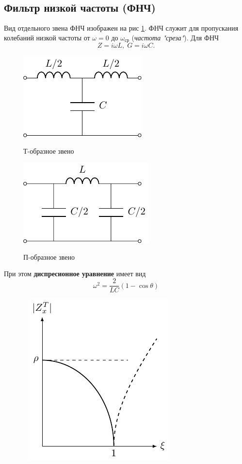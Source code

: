 \subsection{Фильтр низкой частоты (ФНЧ)}
Вид отдельного звена ФНЧ изображен на рис \ref{fig:1.1}. ФНЧ служит для пропускания колебаний низкой частоты от $\omega=0$ до $\omega_{\text{ср}}$ (\textit{частота "среза"}). Для ФНЧ
\begin{equation}
\label{eq:5.1.1}
Z=i\omega L,\;G=i\omega C.
\end{equation}
\begin{figure}[h!]
	\begin{minipage}{0.49\linewidth}
		\centering
		\includegraphics[]{chem/FLF/FLFT.pdf}
		\caption*{Т-образное звено}
	\end{minipage}
\begin{minipage}{0.49\linewidth}
	\centering
	\includegraphics[]{chem/FLF/FLFP.pdf}
	\caption*{П-образное звено}
\end{minipage}
\caption{}
\label{fig:1.1}
\end{figure}
При этом \textbf{диспресионное уравнение} имеет вид 
\begin{equation}
\label{eq:5.1.2}
\omega^2=\frac{2}{LC}(1-\cos\theta)
\end{equation}
\begin{figure}[h!] 
	\centering
	\includegraphics[]{chem/FLF/ZxT.pdf}
	\caption{}
	\label{fig:1.2}
\end{figure}
